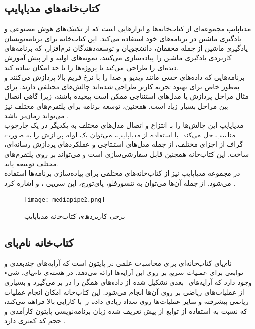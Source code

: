 \subsection[کتاب‌خانه‌های مدیاپایپ]{کتاب‌خانه‌های مدیاپایپ \protect{}}
مدیاپایپ مجموعه‌ای از کتاب‌خانه‌ها و ابزارهایی است که از تکنیک‌های هوش مصنوعی و یادگیری ماشین در برنامه‌های خود استفاده می‌کند. این کتاب‌خانه برای برنامه‌نویسان یادگیری ماشین از جمله محققان، دانشجویان و توسعه‌دهندگان
 نرم‌افزار، که برنامه‌های کاربردی یادگیری ماشین را پیاده‌سازی می‌کنند، نمونه‌های اولیه و از پیش آموزش دیده‌ای را طراحی می‌کند تا پروژه‌ها را تا حد امکان ساده کند.
\\
برنامه‌هایی که داده‌های حسی مانند ویدیو و صدا را با نرخ فریم بالا پردازش می‌کنند و به‌طور خاص برای بهبود تجربه کاربر
 طراحی شده‌اند چالش‌های محتلفی دارند. برای مثال مراحل پردازش یا مدل‌های استنتاجی ممکن است پیچیده باشند، زیرا گاهی اتصال بین مراحل بسیار زیاد است. همچنین، توسعه برنامه برای پلتفرم‌های مختلف نیز می‌تواند زمان‌بر باشد \cite{lugaresi2019mediapipe}. 
\\
مدیاپایپ این چالش‌ها را با انتزاع و اتصال مدل‌های مختلف به یکدیگر در یک چارچوب مناسب حل می‌کند. با استفاده از مدیاپایپ، می‌توان یک لوله پردازش را به صورت گراف از اجزای مختلف، از جمله مدل‌های استنتاجی و عملکردهای پردازش رسانه‌ای، ساخت. این کتاب‌خانه همچنین قابل سفارشی‌سازی است و می‌تواند بر روی پلتفرم‌های مختلف توسعه یابد.
\\
در مجموعه مدیاپایپ نیز از کتاب‌خانه‌های مختلفی برای پیاده‌سازی برنامه‌ها استفاده می‌شود. از جمله آن‌ها می‌توان به تنسورفلو، پای‌تورچ، اپن سی‌پی
،  و  اشاره کرد \cite{harris2021applying}.


\begin{figure}[h]
    \centering
    \texttt{[image: mediapipe2.png]}
    \caption[برخی کاربردهای کتاب‌خانه مدیاپایپ]{برخی کاربردهای کتاب‌خانه مدیاپایپ \cite{harris2021applying}}
\end{figure}

\subsection{کتاب‌خانه نام‌پای}
نام‌پای کتاب‌خانه‌ای برای محاسبات علمی در پایتون است که آرایه‌های چندبعدی و توابعی برای عملیات سریع  بر روی این آرایه‌ها ارائه می‌دهد. در هسته‌ی نام‌پای، شیء  وجود 
دارد که آرایه‌های -بعدی تشکیل شده از داده‌های همگن را در بر می‌گیرد و بسیاری از عملیات‌های ریاضی بر روی آن‌ها انجام می‌شود. این کتاب‌خانه امکان انجام عملیات ریاضی پیشرفته و سایر 
عملیات‌ها روی تعداد زیادی داده را با کارایی بالا فراهم می‌کند، که نسبت به استفاده از توابع از پیش تعریف شده زبان برنامه‌نویسی پایتون کارآمدی و حجم کد کمتری دارد \cite{WhatisNu62:online}.

